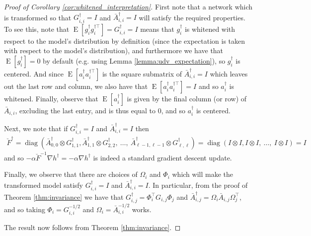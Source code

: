 \documentclass[12pt]{article}
\newcommand{\expected}{\operatorname{E}}
\newcommand{\diag}{\operatorname{diag}}
\begin{document}
\begin{proof}[Proof of Corollary \ref{cor:whitened_interpretation}]

First note that a network which is transformed so that $G^\dagger_{i,i} = I$ and $\bar{A}^\dagger_{i,i} = I$ will satisfy the required properties.  To see this, note that $\expected[g^\dagger_i  g^{\dagger\top}_i] = G^\dagger_{i,i} = I$ means that $g^\dagger_i$ is whitened with respect to the model's distribution by definition (since the expectation is taken with respect to the model's distribution), and furthermore we have that $\expected[g^\dagger_i] = 0$ by default (e.g. using Lemma \ref{lemma:udv_expectation}), so $g^\dagger_i$ is centered.  And since $\expected[a^\dagger_i  a^{\dagger\top}_i]$ is the square submatrix of $\bar{A}^\dagger_{i,i} = I$ which leaves out the last row and column, we also have that $\expected[a^\dagger_i  a^{\dagger\top}_i] = I$ and so $a^\dagger_i$ is whitened.  Finally, observe that $\expected[a^\dagger_i]$ is given by the final column (or row) of $\bar{A}_{i,i}$, excluding the last entry, and is thus equal to $0$, and so $a^\dagger_i$ is centered.

Next, we note that if $G^\dagger_{i,i} = I$ and $\bar{A}^\dagger_{i,i} = I$ then
\begin{align*}
\breve{F}^\dagger = \diag\left( \bar{A}^\dagger_{0,0} \otimes G^\dagger_{1,1}, \bar{A}^\dagger_{1,1} \otimes G^\dagger_{2,2}, \: \ldots, \: \bar{A}^\dagger_{\ell-1,\ell-1} \otimes G^\dagger_{\ell,\ell} \right) = \diag\left( I \otimes I, I \otimes I, \: \ldots, \: I \otimes I \right) = I
\end{align*}
and so $-\alpha \breve{F}^{-1} \nabla h^\dagger = -\alpha \nabla h^\dagger$ is indeed a standard gradient descent update.

Finally, we observe that there are choices of $\Omega_i$ and $\Phi_i$ which will make the transformed model satisfy $G^\dagger_{i,i} = I$ and $\bar{A}^\dagger_{i,i} = I$.  In particular, from the proof of Theorem \ref{thm:invariance} we have that $G_{i,j}^\dagger = \Phi_i^\top G_{i,j} \Phi_j$ and $\bar{A}_{i,j}^\dagger = \Omega_i \bar{A}_{i,j} \Omega_j^\top$, and so taking $\Phi_i = G_{i,i}^{-1/2}$ and $\Omega_i = \bar{A}_{i,i}^{-1/2}$ works.

The result now follows from Theorem \ref{thm:invariance}.

\end{proof}
\end{document}
